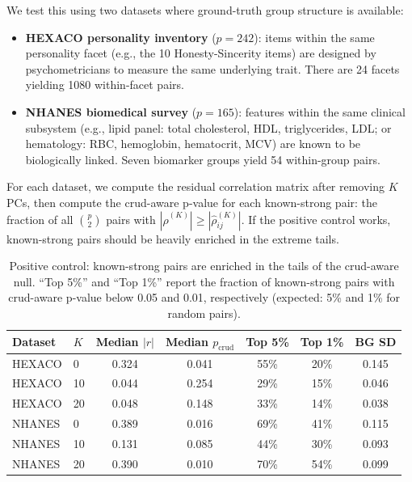 We test this using two datasets where ground-truth group structure is available:

\begin{itemize}
\item \textbf{HEXACO personality inventory} ($p{=}242$): items within the same personality
  facet (e.g., the 10 Honesty-Sincerity items) are designed by psychometricians to measure the
  same underlying trait. There are 24 facets yielding 1080 within-facet pairs.
\item \textbf{NHANES biomedical survey} ($p{=}165$): features within the same clinical
  subsystem (e.g., lipid panel: total cholesterol, HDL, triglycerides, LDL; or hematology:
  RBC, hemoglobin, hematocrit, MCV) are known to be biologically linked.
  Seven biomarker groups yield 54 within-group pairs.
\end{itemize}

For each dataset, we compute the residual correlation matrix after removing $K$ PCs, then
compute the crud-aware p-value for each known-strong pair: the fraction of all
$\binom{p}{2}$ pairs with $|\hat\rho^{(K)}| \ge |\hat\rho^{(K)}_{ij}|$.
If the positive control works, known-strong pairs should be heavily enriched in the
extreme tails.

\begin{table}[h]
\centering
\caption{Positive control: known-strong pairs are enriched in the tails of the crud-aware
null. ``Top 5\%'' and ``Top 1\%'' report the fraction of known-strong pairs with
crud-aware p-value below 0.05 and 0.01, respectively (expected: 5\% and 1\% for
random pairs).}
\label{tab:positive-control}
\begin{tabular}{llccccc}
\toprule
Dataset & $K$ & Median $|r|$ & Median $p_{\mathrm{crud}}$ & Top 5\% & Top 1\% & BG SD \\
\midrule
HEXACO  & 0  & 0.324 & 0.041 & 55\% & 20\% & 0.145 \\
HEXACO  & 10 & 0.044 & 0.254 & 29\% & 15\% & 0.046 \\
HEXACO  & 20 & 0.048 & 0.148 & 33\% & 14\% & 0.038 \\
\midrule
NHANES  & 0  & 0.389 & 0.016 & 69\% & 41\% & 0.115 \\
NHANES  & 10 & 0.131 & 0.085 & 44\% & 30\% & 0.093 \\
NHANES  & 20 & 0.390 & 0.010 & 70\% & 54\% & 0.099 \\
\bottomrule
\end{tabular}
\end{table}

